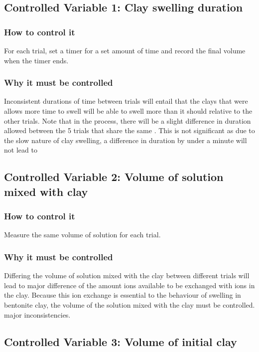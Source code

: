 \documentclass[11pt, letterpaper]{article}
\begin{document}
\begin{paracol}{2}
    \subsection{Controlled Variable 1: Clay swelling duration}
    \subsubsection{How to control it}
    For each trial, set a timer for a set amount of time and record
    the final volume when the timer ends.
    \subsubsection{Why it must be controlled}
    Inconsistent durations of time between trials will entail
    that the clays that were allows more time to swell will be able
    to swell more than it should relative to the other trials.
    Note that in the process, there will be a slight difference in duration
    allowed between the 5 trials that share the same \ce{[H+]}.
    This is not significant as due to the slow nature of clay swelling,
    a difference in duration by under a minute will not lead to
    \switchcolumn
    \subsection{Controlled Variable 2: Volume of solution mixed with clay}
    \subsubsection{How to control it}
    Measure the same volume of solution for each trial.
    \subsubsection{Why it must be controlled}
    Differing the volume of solution mixed with the clay between different
    trials will lead to major difference of the amount  ions available to
    be exchanged with  ions in the clay. Because this ion
    exchange is essential to the behaviour of swelling in bentonite clay,
    the volume of the solution mixed with the clay must be controlled.
    major inconsistencies.
\end{paracol}

\subsection{Controlled Variable 3: Volume of initial clay}
\end{document}

